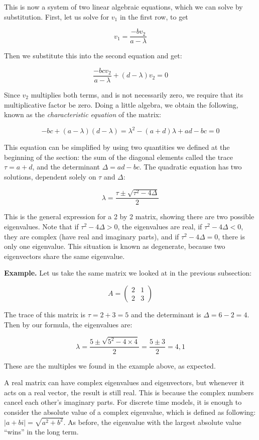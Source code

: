 \documentclass[
  letterpaper,
  DIV=11,
  numbers=noendperiod]{scrreprt}
\begin{document}
This is now a system of two linear algebraic equations, which we can
solve by substitution. First, let us solve for \(v_1\) in the first row,
to get

\[
v_1 = \frac{-bv_2}{a-\lambda}
\]

Then we substitute this into the second equation and get:

\[
\frac{-bcv_2}{a-\lambda} +(d-\lambda)v_2 = 0
\]

Since \(v_2\) multiplies both terms, and is not necessarily zero, we
require that its multiplicative factor be zero. Doing a little algebra,
we obtain the following, known as the \emph{characteristic equation} of
the matrix:

\[
-bc +(a-\lambda)(d-\lambda) = \lambda^2-(a+d)\lambda +ad-bc = 0
\]

This equation can be simplified by using two quantities we defined at
the beginning of the section: the sum of the diagonal elements called
the trace \(\tau = a+d\), and the determinant \(\Delta = ad-bc\). The
quadratic equation has two solutions, dependent solely on \(\tau\) and
\(\Delta\):

\[
\lambda = \frac{\tau \pm \sqrt{\tau^2-4\Delta}}{2}
\]

This is the general expression for a 2 by 2 matrix, showing there are
two possible eigenvalues. Note that if \(\tau^2-4\Delta>0\), the
eigenvalues are real, if \(\tau^2-4\Delta<0\), they are complex (have
real and imaginary parts), and if \(\tau^2-4\Delta=0\), there is only
one eigenvalue. This situation is known as degenerate, because two
eigenvectors share the same eigenvalue.

\textbf{Example.} Let us take the same matrix we looked at in the
previous subsection:

\[
A = \left(\begin{array}{cc}2 & 1 \\ 2& 3\end{array}\right)
\]

The trace of this matrix is \(\tau = 2+3 =5\) and the determinant is
\(\Delta = 6 - 2 = 4\). Then by our formula, the eigenvalues are:

\[
\lambda = \frac{5 \pm \sqrt{5^2-4 \times 4}}{2}  =  \frac{5 \pm 3}{2}  = 4, 1
\]

These are the multiples we found in the example above, as expected.

A real matrix can have complex eigenvalues and eigenvectors, but
whenever it acts on a real vector, the result is still real. This is
because the complex numbers cancel each other's imaginary parts. For
discrete time models, it is enough to consider the absolute value of a
complex eigenvalue, which is defined as following:
\(|a +b i|= \sqrt{a^2 + b^2}\). As before, the eigenvalue with the
largest absolute value ``wins'' in the long term.
\end{document}
